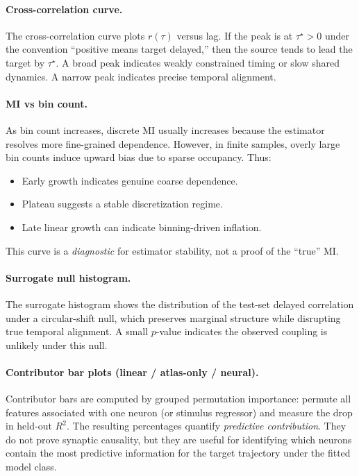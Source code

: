 \documentclass[11pt]{article}
\begin{document}
\paragraph{Cross-correlation curve.}
The cross-correlation curve plots $r(\tau)$ versus lag. If the peak is at $\tau^\star>0$ under the convention ``positive means target delayed,'' then the source tends to lead the target by $\tau^\star$. A broad peak indicates weakly constrained timing or slow shared dynamics. A narrow peak indicates precise temporal alignment.

\paragraph{MI vs bin count.}
As bin count increases, discrete MI usually increases because the estimator resolves more fine-grained dependence. However, in finite samples, overly large bin counts induce upward bias due to sparse occupancy. Thus:
\begin{itemize}
\item Early growth indicates genuine coarse dependence.
\item Plateau suggests a stable discretization regime.
\item Late linear growth can indicate binning-driven inflation.
\end{itemize}
This curve is a \emph{diagnostic} for estimator stability, not a proof of the ``true'' MI.

\paragraph{Surrogate null histogram.}
The surrogate histogram shows the distribution of the test-set delayed correlation under a circular-shift null, which preserves marginal structure while disrupting true temporal alignment. A small $p$-value indicates the observed coupling is unlikely under this null.

\paragraph{Contributor bar plots (linear / atlas-only / neural).}
Contributor bars are computed by grouped permutation importance: permute all features associated with one neuron (or stimulus regressor) and measure the drop in held-out $R^2$. The resulting percentages quantify \emph{predictive contribution}. They do not prove synaptic causality, but they are useful for identifying which neurons contain the most predictive information for the target trajectory under the fitted model class.
\end{document}
